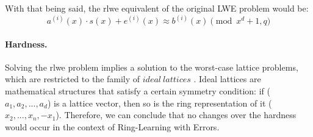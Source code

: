 \documentclass[11pt,
  titlepage=false,
  abstract=on,
]{scrreprt}
\begin{document}
With that being said, the \gls{rlwe} equivalent of the original LWE problem would be:
\begin{equation*}
  a^{(i)}(x) \cdot s(x) + e^{(i)}(x) \approx b^{(i)}(x) \pmod{x^d + 1, q}
  \label{The Ring-Learning with Errors Problem}
\end{equation*}


\paragraph{Hardness.} Solving the \gls{rlwe} problem implies a solution to the worst-case lattice problems, which are restricted to the family of $ideal\ lattices$ \cite{lyubashevsky2010ideal}. Ideal lattices are mathematical
structures that satisfy a certain symmetry condition: if ($a_1, a_2,..., a_d$) is a lattice vector, then so is the ring representation of it ($x_2,...,x_n, -x_1$).
Therefore, we can conclude that no changes over the hardness would occur in the context of Ring-Learning with Errors.
\end{document}
